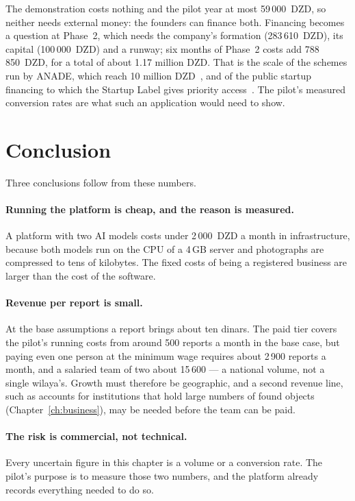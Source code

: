 The demonstration costs nothing and the pilot year at most 59\,000~DZD, so
neither needs external money: the founders can finance both. Financing becomes
a question at Phase~2, which needs the company's formation (283\,610~DZD), its
capital (100\,000~DZD) and a runway; six months of Phase~2 costs add
788\,850~DZD, for a total of about 1.17 million DZD. That is the scale of the
schemes run by ANADE, which reach 10 million DZD~\cite{anade2025}, and of the
public startup financing to which the Startup Label gives priority
access~\cite{startupdz,startuplabel2026}. The pilot's measured conversion rates
are what such an application would need to show.

\section{Conclusion}

Three conclusions follow from these numbers.

\paragraph{Running the platform is cheap, and the reason is measured.} A
platform with two AI models costs under 2\,000~DZD a month in infrastructure,
because both models run on the CPU of a 4\,GB server and photographs are
compressed to tens of kilobytes. The fixed costs of being a registered business
are larger than the cost of the software.

\paragraph{Revenue per report is small.} At the base assumptions a report
brings about ten dinars. The paid tier covers the pilot's running costs from
around 500 reports a month in the base case, but paying even one person at the
minimum wage requires about 2\,900 reports a month, and a salaried team of two
about 15\,600 --- a national volume, not a single wilaya's. Growth must
therefore be geographic, and a second revenue line, such as accounts for
institutions that hold large numbers of found objects
(Chapter~\ref{ch:business}), may be needed before the team can be paid.

\paragraph{The risk is commercial, not technical.} Every uncertain figure in this
chapter is a volume or a conversion rate. The pilot's purpose is to measure
those two numbers, and the platform already records everything needed to do so.
